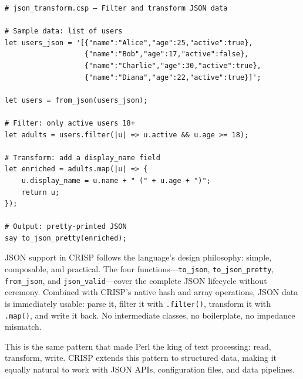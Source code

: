 \begin{tcolorbox}[colback=codebg, colframe=darkpurple, colbacktitle=darkpurple, title=\textbf{\textcolor{codegold}{JSON Transform Pipeline (json\_transform.csp)}}, fonttitle=\bfseries, sharp corners]
\begin{lstlisting}
# json_transform.csp — Filter and transform JSON data

# Sample data: list of users
let users_json = '[{"name":"Alice","age":25,"active":true},
                   {"name":"Bob","age":17,"active":false},
                   {"name":"Charlie","age":30,"active":true},
                   {"name":"Diana","age":22,"active":true}]';

let users = from_json(users_json);

# Filter: only active users 18+
let adults = users.filter(|u| => u.active && u.age >= 18);

# Transform: add a display_name field
let enriched = adults.map(|u| => {
    u.display_name = u.name + " (" + u.age + ")";
    return u;
});

# Output: pretty-printed JSON
say to_json_pretty(enriched);
\end{lstlisting}
\end{tcolorbox}

\vspace{1.5cm}
\begin{tcolorbox}[colback=lightlavender, colframe=softvioletdark, title=\textbf{\textcolor{darkpurple}{Why JSON Matters in CRISP}}, fonttitle=\bfseries, sharp corners]
JSON support in CRISP follows the language's design philosophy: simple, composable, and practical. The four functions—\texttt{to\_json}, \texttt{to\_json\_pretty}, \texttt{from\_json}, and \texttt{json\_valid}—cover the complete JSON lifecycle without ceremony. Combined with CRISP's native hash and array operations, JSON data is immediately usable: parse it, filter it with \texttt{.filter()}, transform it with \texttt{.map()}, and write it back. No intermediate classes, no boilerplate, no impedance mismatch.

This is the same pattern that made Perl the king of text processing: read, transform, write. CRISP extends this pattern to structured data, making it equally natural to work with JSON APIs, configuration files, and data pipelines.
\end{tcolorbox}
